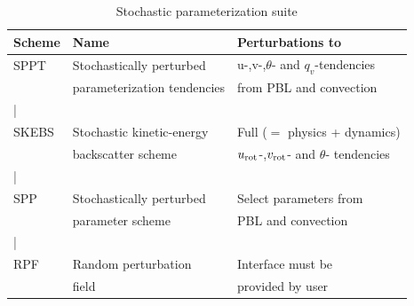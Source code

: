 \begin{table}[h!]
\begin{center}
\caption{Stochastic parameterization suite}
\begin{tabular}{ | l | l | l |}
\hline
Scheme          & Name & Perturbations to \\ 
\hline
SPPT  & Stochastically perturbed    &  u-,v-,$\theta$- and $q_v$-tendencies\\
      & parameterization tendencies &  from PBL and convection\\ | \\
SKEBS & Stochastic kinetic-energy   &  Full ($=$ physics + dynamics) \\
      & backscatter scheme          &  $u_{\rm rot}$-,$v_{\rm rot}$- and $\theta$- tendencies\\ | \\
SPP & Stochastically perturbed      &  Select parameters from\\
    & parameter scheme              &  PBL and convection \\ | \\
RPF & Random perturbation           &  Interface must be \\
    & field                         &  provided by user\\
\hline
\end{tabular}
\end{center}
\label{stoch_table}
\end{table}

